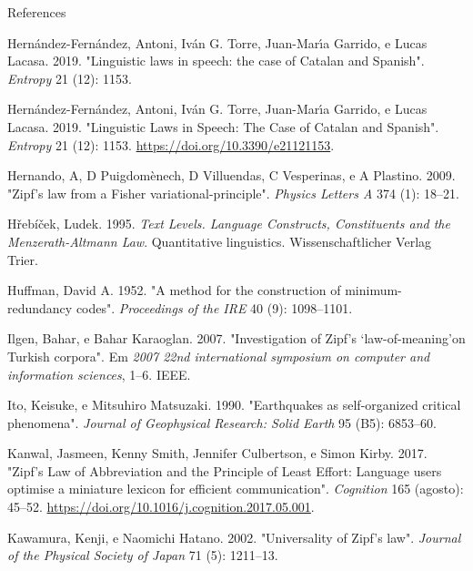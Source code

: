\documentclass[
  ignorenonframetext,
  aspectratio=169]{beamer}
\newlength{\cslhangindent}
\newlength{\cslentryspacingunit} %
\newenvironment{CSLReferences}[2] %
 {%
  \setlength{\parindent}{0pt}
  \ifodd #1
  \let\oldpar\par
  \def\par{\hangindent=\cslhangindent\oldpar}
  \fi
  \setlength{\parskip}{#2\cslentryspacingunit}
 }%
 {}
\begin{document}
\begin{frame}[allowframebreaks]{References}
\begin{CSLReferences}{1}{0}
\leavevmode{}%
Hernández-Fernández, Antoni, Iván G. Torre, Juan-Marı́a Garrido, e Lucas
Lacasa. 2019. {"Linguistic laws in speech: the case of Catalan and
Spanish"}. \emph{Entropy} 21 (12): 1153.

\leavevmode{}%
Hernández-Fernández, Antoni, Iván G. Torre, Juan-Marı́a Garrido, e Lucas
Lacasa. 2019. {"Linguistic Laws in Speech: The Case of Catalan and
Spanish"}. \emph{Entropy} 21 (12): 1153.
\url{https://doi.org/10.3390/e21121153}.

\leavevmode{}%
Hernando, A, D Puigdomènech, D Villuendas, C Vesperinas, e A Plastino.
2009. {"Zipf's law from a Fisher variational-principle"}. \emph{Physics
Letters A} 374 (1): 18--21.

\leavevmode{}%
Hřebíček, Ludek. 1995. \emph{Text Levels. Language Constructs,
Constituents and the Menzerath-Altmann Law}. Quantitative linguistics.
Wissenschaftlicher Verlag Trier.

\leavevmode{}%
Huffman, David A. 1952. {"A method for the construction of
minimum-redundancy codes"}. \emph{Proceedings of the IRE} 40 (9):
1098--1101.

\leavevmode{}%
Ilgen, Bahar, e Bahar Karaoglan. 2007. {"Investigation of Zipf's
`law-of-meaning'on Turkish corpora"}. Em \emph{2007 22nd international
symposium on computer and information sciences}, 1--6. IEEE.

\leavevmode{}%
Ito, Keisuke, e Mitsuhiro Matsuzaki. 1990. {"Earthquakes as
self-organized critical phenomena"}. \emph{Journal of Geophysical
Research: Solid Earth} 95 (B5): 6853--60.

\leavevmode{}%
Kanwal, Jasmeen, Kenny Smith, Jennifer Culbertson, e Simon Kirby. 2017.
{"Zipf's Law of Abbreviation and the Principle of Least Effort: Language
users optimise a miniature lexicon for efficient communication"}.
\emph{Cognition} 165 (agosto): 45--52.
\url{https://doi.org/10.1016/j.cognition.2017.05.001}.

\leavevmode{}%
Kawamura, Kenji, e Naomichi Hatano. 2002. {"Universality of Zipf's
law"}. \emph{Journal of the Physical Society of Japan} 71 (5): 1211--13.


\end{CSLReferences}
\end{frame}
\end{document}
